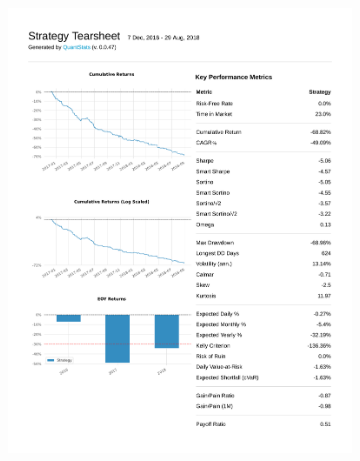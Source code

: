 \documentclass[12pt,a4paper]{article}
\begin{document}
\begin{figure}[ht!]
\begin{subfigure}[ht!]{0.45\textwidth}
    \includegraphics[page=2, width=\textwidth]{plots/qs_a2c.pdf}
  \end{subfigure}
  \begin{subfigure}[ht!]{0.45\textwidth}

\end{subfigure}
\end{figure}
\end{document}
